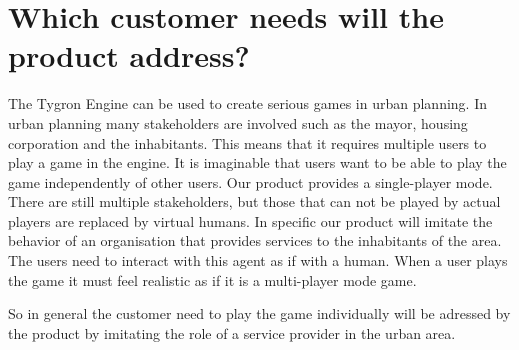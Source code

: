 \section{Which customer needs will the product address?}



The Tygron Engine can be used to create serious games in urban planning. In urban planning many stakeholders are involved such as the mayor, housing corporation and the inhabitants. This means that it requires multiple users to play a game in the engine. It is imaginable that users want to be able to play the game independently of other users. Our product provides a single-player mode. There are still multiple stakeholders, but those that can not be played by actual players are replaced by virtual humans. In specific our product will imitate the behavior of an organisation that provides services to the inhabitants of the area. The users need to interact with this agent as if with a human. When a user plays the game it must feel realistic as if it is a multi-player mode game. \newline



So in general the customer need to play the game individually will be adressed by the product by imitating the role of a service provider in the urban area.